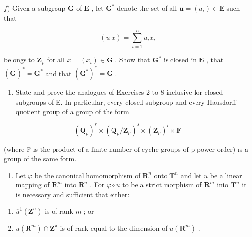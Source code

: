 \(f)\) Given a subgroup \(\mathbf{G}\) of \(\mathbf{E}\) , let \(\mathbf{G}^*\) denote the set of all \(\boldsymbol{u} = (u_i) \in \mathbf{E}\) such that

\[
(u | x) = \sum_ {i = 1} ^ {n} u _ {i} x _ {i}
\]

belongs to \(\mathbf{Z}_p\) for all \(x = (x_i) \in \mathbf{G}\) . Show that \(\mathbf{G}^*\) is closed in \(\mathbf{E}\) , that \((\overline{\mathbf{G}})^* = \mathbf{G}^*\) and that \((\mathbf{G}^*)^* = \overline{\mathbf{G}}\) .

\begin{enumerate}
\def\labelenumi{\alph{enumi})}
\setcounter{enumi}{6}
\tightlist
\item
  State and prove the analogues of Exercises 2 to 8 inclusive for closed subgroups of E. In particular, every closed subgroup and every Hausdorff quotient group of a group of the form
\end{enumerate}

\[
(\mathbf {Q} _ {p}) ^ {r} \times (\mathbf {Q} _ {p} / \mathbf {Z} _ {p}) ^ {s} \times (\mathbf {Z} _ {p}) ^ {t} \times \mathbf {F}
\]

(where F is the product of a finite number of cyclic groups of p-power order) is a group of the same form.

\ExerciseSection

\begin{enumerate}
\def\labelenumi{\arabic{enumi})}
\tightlist
\item
  Let \(\varphi\) be the canonical homomorphism of \(\mathbf{R}^n\) onto \(\mathbf{T}^n\) and let \(u\) be a linear mapping of \(\mathbf{R}^m\) into \(\mathbf{R}^n\) . For \(\varphi \circ u\) to be a strict morphism of \(\mathbf{R}^m\) into \(\mathbf{T}^n\) it is necessary and sufficient that either:
\end{enumerate}

\begin{enumerate}
\def\labelenumi{\alph{enumi})}
\item
  \(\overline{u}^1 (\mathbf{Z}^n)\) is of rank \(m\) ; or
\item
  \(u(\mathbf{R}^m)\cap \mathbf{Z}^n\) is of rank equal to the dimension of \(u(\mathbf{R}^m)\) .
\end{enumerate}

